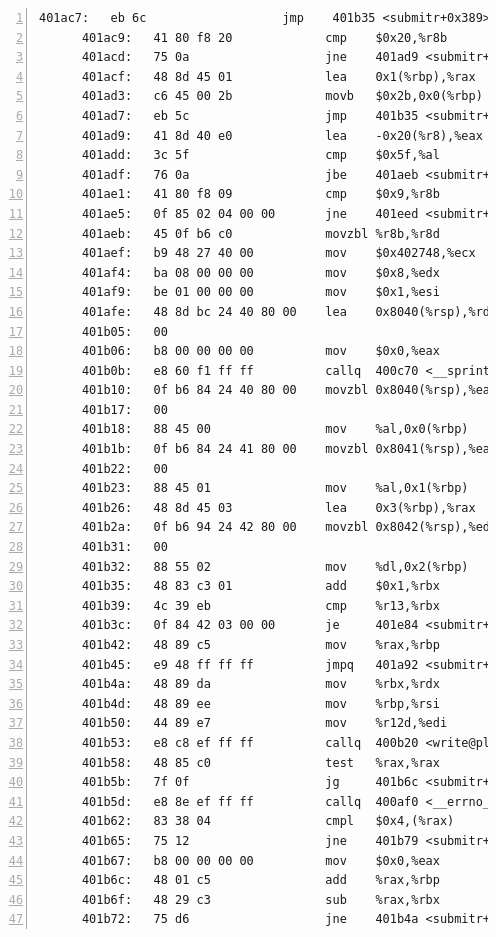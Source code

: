 \documentclass{article}
\begin{document}
\begin{lstlisting}[title = bomb的反汇编代码及部分注释, xleftmargin = 2em,xrightmargin = 2em, aboveskip = 1em, numbers = left, basicstyle=\scriptsize\ttfamily, numberstyle=\scriptsize]
      401ac7:	eb 6c                	jmp    401b35 <submitr+0x389>
      401ac9:	41 80 f8 20          	cmp    $0x20,%r8b
      401acd:	75 0a                	jne    401ad9 <submitr+0x32d>
      401acf:	48 8d 45 01          	lea    0x1(%rbp),%rax
      401ad3:	c6 45 00 2b          	movb   $0x2b,0x0(%rbp)
      401ad7:	eb 5c                	jmp    401b35 <submitr+0x389>
      401ad9:	41 8d 40 e0          	lea    -0x20(%r8),%eax
      401add:	3c 5f                	cmp    $0x5f,%al
      401adf:	76 0a                	jbe    401aeb <submitr+0x33f>
      401ae1:	41 80 f8 09          	cmp    $0x9,%r8b
      401ae5:	0f 85 02 04 00 00    	jne    401eed <submitr+0x741>
      401aeb:	45 0f b6 c0          	movzbl %r8b,%r8d
      401aef:	b9 48 27 40 00       	mov    $0x402748,%ecx
      401af4:	ba 08 00 00 00       	mov    $0x8,%edx
      401af9:	be 01 00 00 00       	mov    $0x1,%esi
      401afe:	48 8d bc 24 40 80 00 	lea    0x8040(%rsp),%rdi
      401b05:	00 
      401b06:	b8 00 00 00 00       	mov    $0x0,%eax
      401b0b:	e8 60 f1 ff ff       	callq  400c70 <__sprintf_chk@plt>
      401b10:	0f b6 84 24 40 80 00 	movzbl 0x8040(%rsp),%eax
      401b17:	00 
      401b18:	88 45 00             	mov    %al,0x0(%rbp)
      401b1b:	0f b6 84 24 41 80 00 	movzbl 0x8041(%rsp),%eax
      401b22:	00 
      401b23:	88 45 01             	mov    %al,0x1(%rbp)
      401b26:	48 8d 45 03          	lea    0x3(%rbp),%rax
      401b2a:	0f b6 94 24 42 80 00 	movzbl 0x8042(%rsp),%edx
      401b31:	00 
      401b32:	88 55 02             	mov    %dl,0x2(%rbp)
      401b35:	48 83 c3 01          	add    $0x1,%rbx
      401b39:	4c 39 eb             	cmp    %r13,%rbx
      401b3c:	0f 84 42 03 00 00    	je     401e84 <submitr+0x6d8>
      401b42:	48 89 c5             	mov    %rax,%rbp
      401b45:	e9 48 ff ff ff       	jmpq   401a92 <submitr+0x2e6>
      401b4a:	48 89 da             	mov    %rbx,%rdx
      401b4d:	48 89 ee             	mov    %rbp,%rsi
      401b50:	44 89 e7             	mov    %r12d,%edi
      401b53:	e8 c8 ef ff ff       	callq  400b20 <write@plt>
      401b58:	48 85 c0             	test   %rax,%rax
      401b5b:	7f 0f                	jg     401b6c <submitr+0x3c0>
      401b5d:	e8 8e ef ff ff       	callq  400af0 <__errno_location@plt>
      401b62:	83 38 04             	cmpl   $0x4,(%rax)
      401b65:	75 12                	jne    401b79 <submitr+0x3cd>
      401b67:	b8 00 00 00 00       	mov    $0x0,%eax
      401b6c:	48 01 c5             	add    %rax,%rbp
      401b6f:	48 29 c3             	sub    %rax,%rbx
      401b72:	75 d6                	jne    401b4a <submitr+0x39e>

\end{lstlisting}
\end{document}
